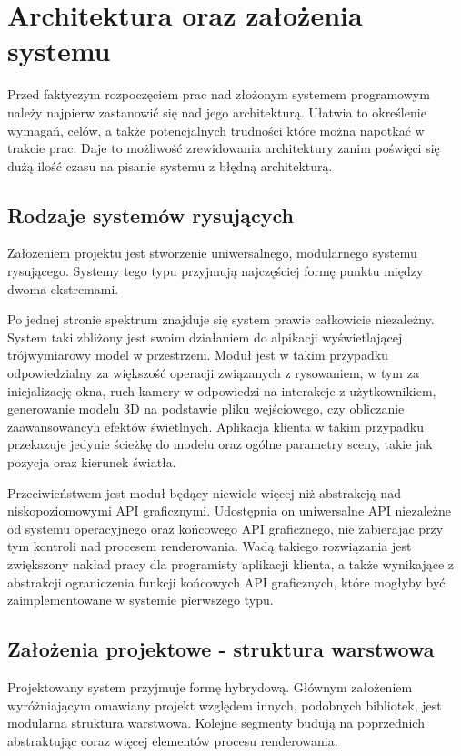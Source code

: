 \chapter{Architektura oraz założenia systemu}
Przed faktyczym rozpoczęciem prac nad złożonym systemem programowym należy najpierw zastanowić się nad jego architekturą.
Ułatwia to określenie wymagań, celów, a także potencjalnych trudności które można napotkać w trakcie prac. 
Daje to możliwość zrewidowania architektury zanim poświęci się dużą ilość czasu na pisanie systemu z błędną architekturą.

\section{Rodzaje systemów rysujących}
Założeniem projektu jest stworzenie uniwersalnego, modularnego systemu rysującego.
Systemy tego typu przyjmują najczęściej formę punktu między dwoma ekstremami. 

Po jednej stronie spektrum znajduje się system prawie całkowicie niezależny. 
System taki zbliżony jest swoim działaniem do alpikacji wyświetlającej trójwymiarowy model w przestrzeni.
Moduł jest w takim przypadku odpowiedzialny za większość operacji związanych z rysowaniem, 
    w tym za inicjalizację okna, ruch kamery w odpowiedzi na interakcje z użytkownikiem,
    generowanie modelu 3D na podstawie pliku wejściowego, czy obliczanie zaawansowancyh efektów świetlnych.
Aplikacja klienta w takim przypadku przekazuje jedynie ścieżkę do modelu oraz ogólne parametry sceny, takie jak pozycja oraz kierunek światła.

Przeciwieństwem jest moduł będący niewiele więcej niż abstrakcją nad niskopoziomowymi API graficznymi.
Udostępnia on uniwersalne API niezależne od systemu operacyjnego oraz końcowego API graficznego,
    nie zabierając przy tym kontroli nad procesem renderowania.
Wadą takiego rozwiązania jest zwiększony nakład pracy dla programisty aplikacji klienta,
    a także wynikające z abstrakcji ograniczenia funkcji końcowych API graficznych, które mogłyby być zaimplementowane w systemie pierwszego typu.

\section{Założenia projektowe - struktura warstwowa}
Projektowany system przyjmuje formę hybrydową.
Głównym założeniem wyróżniającym omawiany projekt względem innych, podobnych bibliotek, jest modularna struktura warstwowa.
Kolejne segmenty budują na poprzednich abstraktując coraz więcej elementów procesu renderowania.

